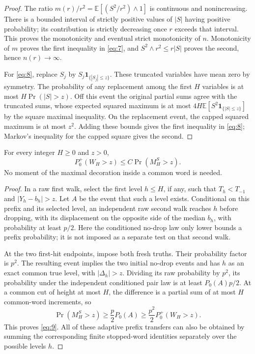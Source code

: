 \begin{proof}
The ratio
\(m(r)/r^2=\mathbb E[(S^2/r^2)\wedge1]\) is continuous and
nonincreasing. There is a bounded interval of strictly positive values
of \(|S|\) having positive probability; its contribution is strictly
decreasing once \(r\) exceeds that interval. This proves the
monotonicity and eventual strict monotonicity of \(n\). Monotonicity of
\(m\) proves the first inequality in \eqref{eq:7}, and
\(S^2\wedge r^2\le r|S|\) proves the second, hence \(n(r)\to\infty\).

For \eqref{eq:8}, replace \(S_j\) by
\(S_j\mathbf1_{\{|S_j|\le z\}}\). These truncated variables have mean
zero by symmetry. The probability of any replacement among the first
\(H\) variables is at most \(H\Pr(|S|>z)\). Off this event the original
partial sums agree with the truncated sums, whose expected squared
maximum is at most
\(4H\mathbb E[S^2\mathbf1_{\{|S|\le z\}}]\) by the square maximal
inequality. On the replacement event, the capped squared maximum is
at most \(z^2\). Adding these bounds gives the first inequality in
\eqref{eq:8}; Markov's inequality for the capped square gives the
second.
\end{proof}

\begin{lemma}\label{fluct-exact-comparison}
For every integer \(H\ge0\) and \(z>0\),
\[
P_0^+(W_H>z)\le C\Pr(M_H^S>z).
\tag{9}\label{eq:9}
\]
No moment of the maximal decoration inside a common word is needed.
\end{lemma}

\begin{proof}
In a raw first walk, select the first level \(h\le H\), if any, such
that \(T_h<T_{-1}\) and \(|Y_h-b_h|>z\). Let \(A\) be the event that
such a level exists. Conditional on this prefix and its selected
level, an independent raw second walk reaches \(h\) before dropping,
with its displacement on the opposite side of the median \(b_h\),
with probability at least \(p/2\). Here the conditioned no-drop law
only lower bounds a prefix probability; it is not imposed as a
separate test on that second walk.

At the two first-hit endpoints, impose both fresh truths. Their
probability factor is \(p^2\). The resulting event implies the two
initial no-drop events and has \(h\) as an exact common true level,
with \(|\Delta_h|>z\). Dividing its raw probability by \(p^2\), its
probability under the independent conditioned pair law is at least
\(P_0(A)p/2\). At a common cut of height at most \(H\), the difference
is a partial sum of at most \(H\) common-word increments, so
\[
\Pr(M_H^S>z)\ge \frac p2P_0(A)
 \ge \frac{p^2}{2}P_0^+(W_H>z).
\]
This proves \eqref{eq:9}. All of these adaptive prefix transfers can
also be obtained by summing the corresponding finite stopped-word
identities separately over the possible levels \(h\).
\end{proof}

